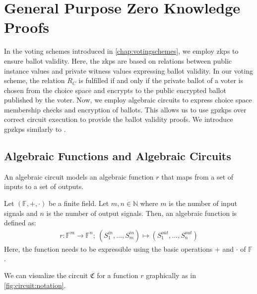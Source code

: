 \chapter{General Purpose Zero Knowledge Proofs}
\label{chap:gpzkp}
In the voting schemes introduced in \cref{chap:votingschemes}, we employ \glspl{zkp} to ensure ballot validity.
Here, the \glspl{zkp} are based on relations between public instance values and private witness values expressing ballot validity.
In our voting scheme, the relation $R_C$ is fulfilled if and only if the private ballot of a voter is chosen from the choice space and encrypts to the public encrypted ballot published by the voter.
Now, we employ algebraic circuits to express choice space membership checks and encryption of ballots.
This allows us to use \glspl{gpzkp} over correct circuit execution to provide the ballot validity proofs.
We introduce \glspl{gpzkp} similarly to \cite{least_authority_moonmath_2024}.

\section{Algebraic Functions and Algebraic Circuits}
An algebraic circuit models an algebraic function $r$ that maps from a set of inputs to a set of outputs.
\begin{definition}
    \label{def:algebraicFunction}
    Let $(\mathbb{F}, +, \cdot)$ be a finite field.
    Let $m, n\in\mathbb{N}$ where $m$ is the number of input signals and $n$ is the number of output signals.
    Then, an algebraic function is defined as:
    \begin{align*}
        r:\mathbb{F}^m\to \mathbb{F}^n;\:(S_1^{in},\dots, S_{m}^{in})\mapsto (S_1^{out},\dots, S_n^{out})
    \end{align*}
    Here, the function needs to be expressible using the basic operations $+$ and $\cdot$ of $\mathbb{F}$.
\end{definition}

We can visualize the circuit $\mathfrak{C}$ for a function $r$ graphically as in \cref{fig:circuit:notation}.

